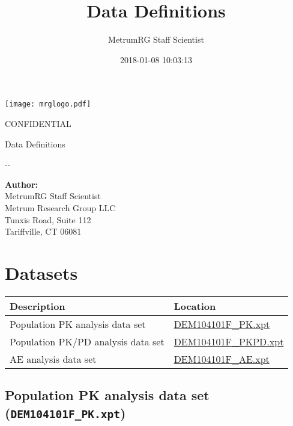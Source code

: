 \documentclass[]{article}
\title{Data Definitions}
\author{MetrumRG Staff Scientist}
\date{2018-01-08 10:03:13}
\newcommand{\todaymetrum}{\the\year-\twodigit{\month}-\twodigit{\day}}
\newcommand{\doctitle}{Data Definitions}
\newcommand{\scientist}{MetrumRG Staff Scientist}
\begin{document}
\begin{center}
\texttt{[image: mrglogo.pdf]}
\vspace{1cm}

{\Large CONFIDENTIAL}
\vspace{3.0cm}

{\huge \doctitle}
\vspace{1cm}

\todaymetrum
\vspace{6cm}

{\large\bfseries Author:}\\
\scientist \\
 Metrum Research Group LLC\\
Tunxis Road, Suite 112\\
Tariffville, CT 06081\\
\end{center}


\newpage



\section{Datasets}\label{datasets}

\begin{tabular}{|p{2.85in}|p{2.55in}|}
\hline
Description & Location\\
\hline
Population PK analysis data set & \hyperref[DEM104101F_PK]{DEM104101F\_PK.xpt}\\
\hline
Population PK/PD analysis data set & \hyperref[DEM104101F_PKPD]{DEM104101F\_PKPD.xpt}\\
\hline
AE analysis data set & \hyperref[DEM104101F_AE]{DEM104101F\_AE.xpt}\\
\hline
\end{tabular}

\subsection{\texorpdfstring{Population PK analysis data set
(\texttt{DEM104101F\_PK.xpt})
\label{DEM104101F_PK}}{Population PK analysis data set (DEM104101F\_PK.xpt) }}\label{population-pk-analysis-data-set-dem104101f_pk.xpt}

\noindent
\end{document}
